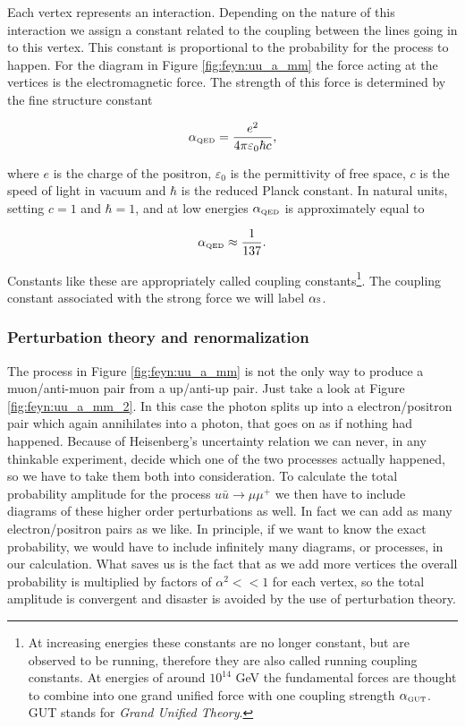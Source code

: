 Each vertex represents an interaction. Depending on the nature of this interaction we assign a constant related to the coupling between the lines going in to this vertex. This constant is proportional to the probability for the process to happen. For the diagram in Figure \ref{fig:feyn:uu_a_mm} the force acting at the vertices is the electromagnetic force. The strength of this force is determined by the fine structure constant

\begin{equation}
	\alpha_{\textrm{\tiny{QED}}} = \frac{e^2}{4\pi\varepsilon_0\hbar c},
\end{equation}

where $e$ is the charge of the positron, $\varepsilon_0$ is the permittivity of free space, $c$ is the speed of light in vacuum and $\hbar$ is the reduced Planck constant. In natural units, setting $c = 1$ and $\hbar = 1$, and at low energies $\alpha_{\textrm{\tiny{QED}}}$ is approximately equal to

\begin{equation}
	 \alpha_{\textrm{\tiny{QED}}} \approx \frac{1}{137}.
\end{equation}

Constants like these are appropriately called coupling constants\footnote{At increasing energies these constants are no longer constant, but are observed to be running, therefore they are also called running coupling constants. At energies of around $10^{14}$ GeV the fundamental forces are thought to combine into one grand unified force with one coupling strength $\alpha_{\textrm{\tiny{GUT}}}$. GUT stands for \emph{Grand Unified Theory}.}. The coupling constant associated with the strong force we will label $\alpha{\textrm{\tiny{S}}}$.

\subsubsection{Perturbation theory and renormalization}
The process in Figure \ref{fig:feyn:uu_a_mm} is not the only way to produce a muon/anti-muon pair from a up/anti-up pair. Just take a look at Figure \ref{fig:feyn:uu_a_mm_2}. In this case the photon splits up into a electron/positron pair which again annihilates into a photon, that goes on as if nothing had happened. Because of Heisenberg's uncertainty relation we can never, in any thinkable experiment, decide which one of the two processes actually happened, so we have to take them both into consideration. To calculate the total probability amplitude for the process $u \bar u \rightarrow \mu \mu^+$ we then have to include diagrams of these higher order perturbations as well. In fact we can add as many electron/positron pairs as we like. In principle, if we want to know the exact probability, we would have to include infinitely many diagrams, or processes, in our calculation. What saves us is the fact that as we add more vertices the overall probability is multiplied by factors of $\alpha^2 << 1$ for each vertex, so the total amplitude is convergent and disaster is avoided by the use of perturbation theory.


